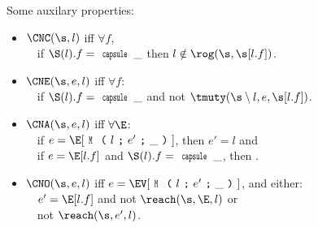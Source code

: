 Some auxilary properties:\\

\newcommand{\qindent}{\\\indent$\quad$}
\SSI\begin{itemize}
\item $\CNC(\s, l)$ iff $\forall f$,
\qindent if  $\S(l).f = \Kw{capsule}\,\_$ then $l \notin \rog(\s, \s[l.f])$.
\item $\CNE(\s, e, l)$ iff $\forall f$:
\qindent  if $\S(l).f = \Kw{capsule}\,\_$ and not $\tmuty(\s\setminus l, e, \s[l.f])$.
\item $\CNA(\s, e, l)$ iff $\forall \E$:
\qindent if $e = \E[\M{l}{e'}{\_}]$, then $e' = l$ and
\qindent if $e = \E[l.f]$ and $\S(l).f = \Kw{capsule}\,\_$, then .

\item $\CNO(\s, e, l)$ iff $e = \EV[\M{l}{e'}{\_}]$, and either:
\qindent $e' = \E[l.f]$ and not $\reach(\s, \E, l)$ or 
\qindent not $\reach(\s, e', l)$.

\end{itemize}

